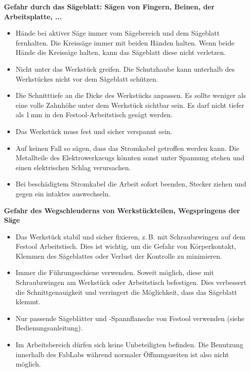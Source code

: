 \documentclass{\basedir/fablab-document}
\begin{document}
\textbf{Gefahr durch das Sägeblatt: Sägen von Fingern, Beinen, der Arbeitsplatte, ...}
\begin{itemize}
\item Hände bei aktiver Säge immer vom Sägebereich und dem Sägeblatt fernhalten. Die Kreissäge immer mit beiden Händen halten. Wenn beide Hände die Kreissäge halten, kann das Sägeblatt diese nicht verletzen.

\item Nicht unter das Werkstück greifen. Die Schutzhaube kann unterhalb des Werkstückes nicht vor dem Sägeblatt schützen.

\item Die Schnitttiefe an die Dicke des Werkstücks anpassen. Es sollte weniger als eine volle Zahnhöhe unter dem Werkstück sichtbar sein. Es darf nicht tiefer als 1\,mm in den Festool-Arbeitstisch gesägt werden.

\item Das Werkstück muss fest und sicher verspannt sein.

\item Auf keinen Fall so sägen, dass das Stromkabel getroffen werden kann. Die Metallteile des Elektrowerkzeugs könnten sonst unter Spannung stehen und einen elektrischen Schlag verursachen.

\item Bei beschädigtem Stromkabel die Arbeit sofort beenden, Stecker ziehen und gegen ein intaktes auswechseln.
\end{itemize}

\textbf{Gefahr des Wegschleuderns von Werkstückteilen, Wegspringens der Säge}
\begin{itemize}
\item Das Werkstück stabil und sicher fixieren, z.\,B. mit Schraubzwingen auf dem Festool Arbeitstisch. Dies ist wichtig,
um die Gefahr von Körperkontakt, Klemmen des Sägeblattes oder Verlust der Kontrolle zu minimieren.

\item Immer die Führungsschiene verwenden. Soweit möglich, diese mit Schraubzwingen am Werkstück oder Arbeitstisch befestigen. Dies verbessert die Schnittgenauigkeit und verringert die Möglichkeit, dass das Sägeblatt klemmt.

\item Nur passende Sägeblätter und -Spannflansche von Festool verwenden (siehe Bedienungsanleitung).

\item Im Arbeitsbereich dürfen sich keine Unbeteiligten befinden. Die Benutzung innerhalb des FabLabs während normaler Öffnungszeiten ist also nicht möglich.
\end{itemize}
\end{document}
